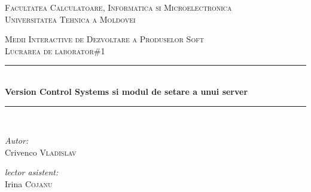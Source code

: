 \documentclass[a4paper, 12pt]{article}
\begin{document}
\begin{titlepage}

	\begin{center}
	\textsc{\large Facultatea Calculatoare, Informatica si Microelectronica}\\[0.5cm]
	\textsc{\large Universitatea Tehnica a Moldovei}\\[1.2cm]
	\vspace{25mm}

	\textsc{\Large Medii Interactive de Dezvoltare a Produselor Soft}\\[0.5cm]
  	\textsc{\large Lucrarea de laborator\#1}\\[0.5cm] 

	\newcommand{\HRule}{\rule{\linewidth}{0.5mm}} 
	\vspace{10 mm}

  	\HRule \\[0.4cm]

 	 { \LARGE \bfseries Version Control Systems si modul de setare a unui server  }\\[0.4cm] 

  	\HRule \\[1.5cm]

	\vspace{30mm}

	\begin{minipage}{0.4\textwidth}
	\begin{flushleft} \large
	\emph{Autor:} \\
	Crivenco \textsc{Vladislav}\\
	\end{flushleft}
	\end{minipage}
      	\begin{minipage}{0.4\textwidth}

      	\begin{flushright} \large

      	\emph{lector asistent:} \\

      	Irina \textsc{Cojanu} \\ %

     	 \end{flushright}

      	\end{minipage}\\[4cm]



     	\vspace{5 mm}

	\vfill

	\end{center}

\end{titlepage}
\end{document}
